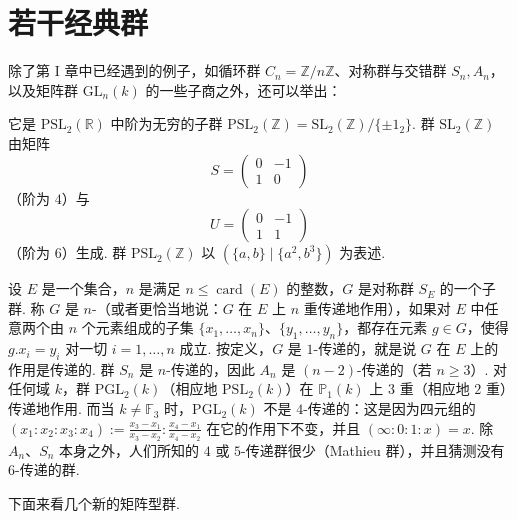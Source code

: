 \section{若干经典群}\label{sec:fg-2-4}
除了第 I 章中已经遇到的例子，如循环群 $C_n=\mathbb{Z}/n\mathbb{Z}$、对称群与交错群 $S_n,A_n$，以及矩阵群 $\mathrm{GL}_n(k)$ 的一些子商之外，还可以举出：
\begin{numpara}[模群]\label{np:fg-2-4-1}
它是 $\mathrm{PSL}_2(\mathbb{R})$ 中阶为无穷的子群 $\mathrm{PSL}_2(\mathbb{Z})=\mathrm{SL}_2(\mathbb{Z})/\{\pm 1_2\}$. 群 $\mathrm{SL}_2(\mathbb{Z})$ 由矩阵
\[
S=\begin{pmatrix}0 & -1\\ 1 & 0\end{pmatrix}
\]
（阶为 $4$）与
\[
U=\begin{pmatrix}0 & -1\\ 1 & 1\end{pmatrix}
\]
（阶为 $6$）生成. 群 $\mathrm{PSL}_2(\mathbb{Z})$ 以 $(\{a,b\}\mid\{a^2,b^3\})$ 为表述.
\end{numpara}
\begin{numpara}[$n$-传递群]\label{np:fg-2-4-2}
设 $E$ 是一个集合，$n$ 是满足 $n\leqslant\operatorname{card}(E)$ 的整数，$G$ 是对称群 $S_E$ 的一个子群. 称 $G$ 是 $n$-（或者更恰当地说：$G$ 在 $E$ 上 $n$ 重传递地作用），如果对 $E$ 中任意两个由 $n$ 个元素组成的子集 $\{x_1,\ldots,x_n\}$、$\{y_1,\ldots,y_n\}$，都存在元素 $g\in G$，使得 $g.x_i=y_i$ 对一切 $i=1,\ldots,n$ 成立. 按定义，$G$ 是 $1$-传递的，就是说 $G$ 在 $E$ 上的作用是传递的. 群 $S_n$ 是 $n$-传递的，因此 $A_n$ 是 $(n-2)$-传递的（若 $n\geqslant 3$）. 对任何域 $k$，群 $\mathrm{PGL}_2(k)$（相应地 $\mathrm{PSL}_2(k)$）在 $\mathbb{P}_1(k)$ 上 $3$ 重（相应地 $2$ 重）传递地作用. 而当 $k\neq\mathbb{F}_3$ 时，$\mathrm{PGL}_2(k)$ 不是 $4$-传递的：这是因为四元组的 $(x_1:x_2:x_3:x_4):=\frac{x_3-x_1}{x_3-x_2}:\frac{x_4-x_1}{x_4-x_2}$ 在它的作用下不变，并且 $(\infty:0:1:x)=x$. 除 $A_n$、$S_n$ 本身之外，人们所知的 $4$ 或 $5$-传递群很少（Mathieu 群），并且猜测没有 $6$-传递的群.
\end{numpara}
下面来看几个新的矩阵型群.

